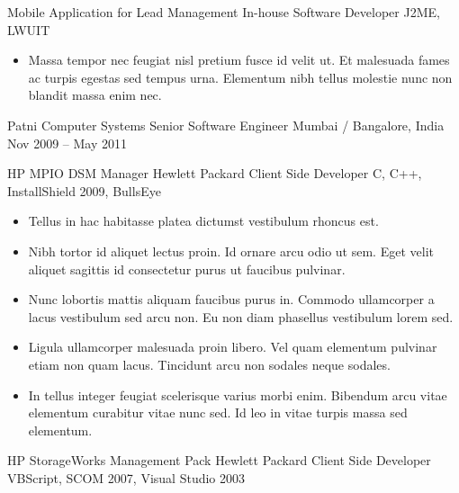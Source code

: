 \documentclass[10pt, a4paper]{sivu}
\begin{document}
        \project
            {Mobile Application for Lead Management}
            {In-house}
            {Software Developer}
            {J2ME, LWUIT}
    
        \begin{itemize}
            \item Massa tempor nec feugiat nisl pretium fusce id velit ut. Et malesuada fames ac turpis egestas sed tempus urna. Elementum nibh tellus molestie nunc non blandit massa enim nec.\smallskip
        \end{itemize}

\smallskip
\divider
\smallskip

    \company
        {Patni Computer Systems}
        {Senior Software Engineer}
        {Mumbai / Bangalore, India}
        {Nov 2009 – May 2011}
        
        \project
            {HP MPIO DSM Manager}
            {Hewlett Packard}
            {Client Side Developer}
            {C, C++, InstallShield 2009, BullsEye}
    
            \begin{itemize}
                \item Tellus in hac habitasse platea dictumst vestibulum rhoncus est.\smallskip
                \item Nibh tortor id aliquet lectus proin. Id ornare arcu odio ut sem. Eget velit aliquet sagittis id consectetur purus ut faucibus pulvinar.\smallskip
                \item Nunc lobortis mattis aliquam faucibus purus in. Commodo ullamcorper a lacus vestibulum sed arcu non. Eu non diam phasellus vestibulum lorem sed.\smallskip
                \item Ligula ullamcorper malesuada proin libero. Vel quam elementum pulvinar etiam non quam lacus. Tincidunt arcu non sodales neque sodales.\smallskip
                \item In tellus integer feugiat scelerisque varius morbi enim. Bibendum arcu vitae elementum curabitur vitae nunc sed. Id leo in vitae turpis massa sed elementum.\smallskip
            \end{itemize}

        \dividergray
        
        \project
            {HP StorageWorks Management Pack}
            {Hewlett Packard}
            {Client Side Developer}
            {VBScript, SCOM 2007, Visual Studio 2003}
        
\end{document}

